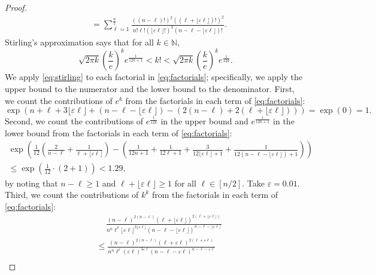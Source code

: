 \documentclass[letterpaper, reqno,11pt]{article}
\newcommand{\NN}{\mathbb{N}}
\begin{document}
\begin{enumerate}
\begin{proof}
\begin{align}
      &= \sum_{\ell = 1}^{\frac{n}{2}} \frac{((n - \ell)!)^2((\ell + \lfloor \varepsilon \ell \rfloor)!)^2}{n!\ell!(\lfloor\varepsilon\ell\rfloor!)^3 (n - \ell - \lfloor \varepsilon\ell \rfloor)!}. \label{eq:factorials}
    \end{align}
    Stirling's approximation says that for all $k \in \NN$,
    \begin{equation} \label{eq:stirling}
      \sqrt{2\pi k} \left(\frac{k}{e}\right)^k e^{\frac{1}{12k + 1}} < k! < \sqrt{2\pi k} \left(\frac{k}{e}\right)^k e^{\frac{1}{12k}}.
    \end{equation}
    We apply \eqref{eq:stirling} to each factorial in \eqref{eq:factorials}; specifically, we apply the upper bound to the numerator and the lower bound to the denominator. First, we count the contributions of $e^k$ from the factorials in each term of \eqref{eq:factorials}:
    $$ \exp\left(n + \ell + 3\lfloor \varepsilon \ell \rfloor + (n - \ell - \lfloor \varepsilon \ell \rfloor) - (2(n - \ell) + 2(\ell + \lfloor \varepsilon \ell \rfloor))\right) = \exp(0) = 1. $$
    Second, we count the contributions of $e^{\frac{1}{12k}}$ in the upper bound and $e^{\frac{1}{12k + 1}}$ in the lower bound from the factorials in each term of \eqref{eq:factorials}:
    \begin{multline*}
      \exp\left(\frac{1}{12}\left(\frac{2}{n - \ell} + \frac{1}{\ell + \lfloor \varepsilon \ell \rfloor}\right) - \left(\frac{1}{12n + 1} + \frac{1}{12 \ell + 1} + \frac{3}{12\lfloor \varepsilon \ell \rfloor + 1} + \frac{1}{12(n - \ell - \lfloor \varepsilon \ell \rfloor) + 1}\right)\right) \\
      \leq \exp\left(\frac{1}{12} \cdot \left(2 + 1\right)\right) < 1.29,
    \end{multline*}
    by noting that $n - \ell \geq 1$ and $\ell + \lfloor \varepsilon \ell \rfloor \geq 1$ for all $\ell \in [n/2]$. Take $\varepsilon = 0.01$. Third, we count the contributions of $k^k$ from the factorials in each term of \eqref{eq:factorials}:
    \begin{align}
      &\quad\, \frac{(n - \ell)^{2(n - \ell)} (\ell + \lfloor \varepsilon \ell \rfloor)^{2(\ell + \lfloor \varepsilon \ell \rfloor)}}{n^n \ell^\ell \lfloor\varepsilon \ell\rfloor^{3\lfloor\varepsilon \ell\rfloor} (n - \ell - \lfloor \varepsilon \ell \rfloor)^{n - \ell - \lfloor \varepsilon \ell \rfloor}} \nonumber \\
      &\leq \frac{(n - \ell)^{2(n - \ell)} (\ell + \varepsilon \ell)^{2(\ell + \varepsilon \ell)}}{n^n \ell^\ell (\varepsilon \ell)^{3\varepsilon \ell} (n - \ell - \varepsilon \ell)^{n - \ell - \varepsilon \ell}} \label{eq:no-floor} \\

\end{align}
\end{proof}
\end{enumerate}
\end{document}
